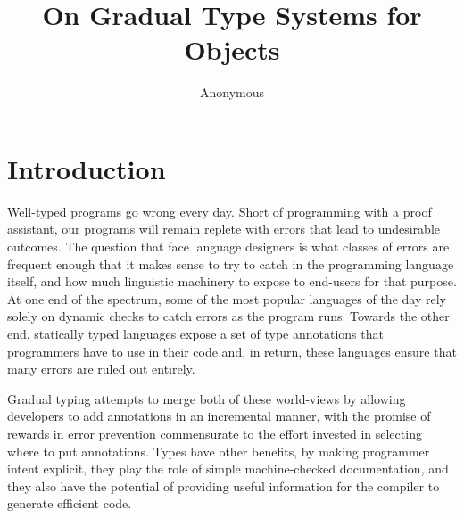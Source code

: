 \documentclass[a4paper,USenglish]{tex/lipics-v2016}
\title{On Gradual Type Systems for Objects}
\author[1]{Anonymous}
\affil[1]{}
\begin{document}

\maketitle


\section{Introduction}
Well-typed programs go wrong every day. Short of programming with a proof
assistant, our programs will remain replete with errors that lead to
undesirable outcomes.  The question that face language designers is what
classes of errors are frequent enough that it makes sense to try to catch in
the programming language itself, and how much linguistic machinery to expose
to end-users for that purpose.  At one end of the spectrum, some of the most
popular languages of the day rely solely on dynamic checks to catch errors
as the program runs. Towards the other end, statically typed languages
expose a set of type annotations that programmers have to use in their code
and, in return, these languages ensure that many errors are ruled out entirely.

Gradual typing attempts to merge both of these world-views by allowing
developers to add annotations in an incremental manner, with the promise of
rewards in error prevention commensurate to the effort invested in selecting
where to put annotations. Types have other benefits, by making programmer
intent explicit, they play the role of simple machine-checked documentation,
and they also have the potential of providing useful information for
the compiler to generate efficient code.
\end{document}
